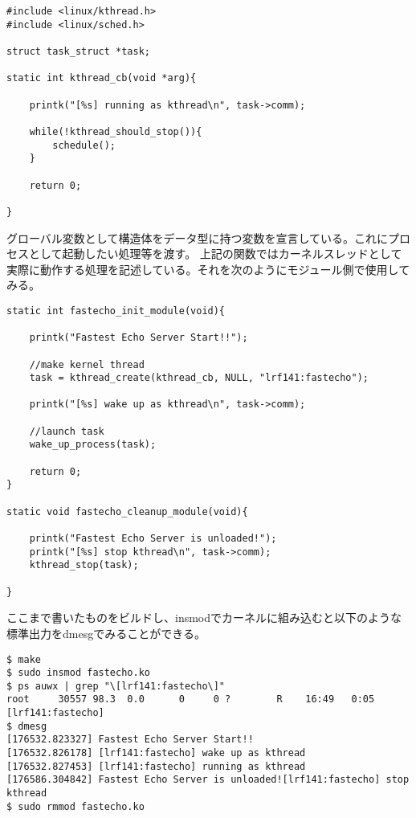 \begin{verbatim}
#include <linux/kthread.h>
#include <linux/sched.h>

struct task_struct *task;

static int kthread_cb(void *arg){

    printk("[%s] running as kthread\n", task->comm);

    while(!kthread_should_stop()){
        schedule();
    }

    return 0;

}
\end{verbatim}

グローバル変数として構造体をデータ型に持つ変数を宣言している。これにプロセスとして起動したい処理等を渡す。
上記の関数ではカーネルスレッドとして実際に動作する処理を記述している。それを次のようにモジュール側で使用してみる。

\begin{verbatim}
static int fastecho_init_module(void){

    printk("Fastest Echo Server Start!!");

    //make kernel thread
    task = kthread_create(kthread_cb, NULL, "lrf141:fastecho");
        
    printk("[%s] wake up as kthread\n", task->comm);

    //launch task
    wake_up_process(task);
        
    return 0;
}

static void fastecho_cleanup_module(void){

    printk("Fastest Echo Server is unloaded!");
    printk("[%s] stop kthread\n", task->comm);
    kthread_stop(task);

}
\end{verbatim}

ここまで書いたものをビルドし、insmodでカーネルに組み込むと以下のような標準出力をdmesgでみることができる。
\begin{verbatim}
$ make
$ sudo insmod fastecho.ko
$ ps auwx | grep "\[lrf141:fastecho\]"
root     30557 98.3  0.0      0     0 ?        R    16:49   0:05 [lrf141:fastecho]
$ dmesg
[176532.823327] Fastest Echo Server Start!!
[176532.826178] [lrf141:fastecho] wake up as kthread
[176532.827453] [lrf141:fastecho] running as kthread
[176586.304842] Fastest Echo Server is unloaded![lrf141:fastecho] stop kthread
$ sudo rmmod fastecho.ko
\end{verbatim}

